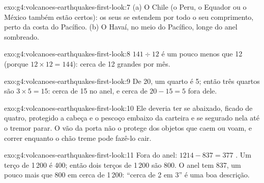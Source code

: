 \begin{solution}{exo:g4:volcanoes-earthquakes-first-look:7}
(a) O Chile (o Peru, o Equador ou o México também estão certos): os seus
 se estendem por todo o seu comprimento, perto da costa do
Pacífico. (b) O Havaí, no meio do  Pacífico, longe do anel sombreado.
\end{solution}

\begin{solution}{exo:g4:volcanoes-earthquakes-first-look:8}
$141 \div 12$ é um pouco menos que 12 (porque $12 \times 12 = 144$): cerca
de 12  grandes por mês.
\end{solution}

\begin{solution}{exo:g4:volcanoes-earthquakes-first-look:9}
De 20, um quarto é 5; então três quartos são $3 \times 5 = 15$: cerca de 15
no anel, e cerca de $20 - 15 = 5$ fora dele.
\end{solution}

\begin{solution}{exo:g4:volcanoes-earthquakes-first-look:10}
Ele deveria ter se abaixado, ficado de quatro, protegido a cabeça e o
pescoço embaixo da carteira e se segurado nela até o tremor parar. O vão
da porta não o protege dos objetos que caem ou voam, e correr enquanto o
chão treme pode fazê-lo cair.
\end{solution}

\begin{solution}{exo:g4:volcanoes-earthquakes-first-look:11}
Fora do anel: $1214 - 837 = 377$ . Um terço de 1\,200 é 400; então
dois terços de 1\,200 são 800. O anel tem 837, um pouco mais que 800 em
cerca de 1\,200: ``cerca de 2 em 3'' é uma boa descrição.
\end{solution}
